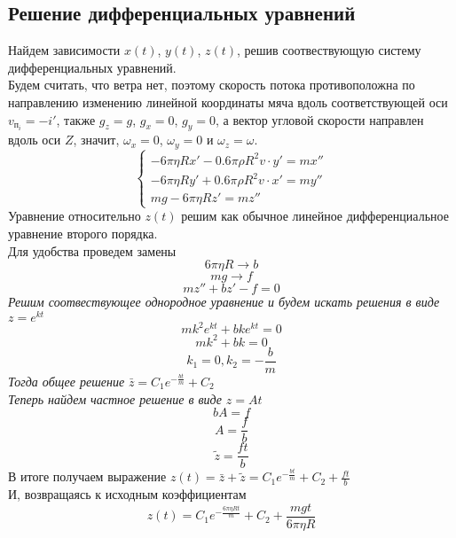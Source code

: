 \documentclass[a5paper, 10pt]{article}
\theoremstyle{definition}
\theoremstyle{plain}
\theoremstyle{remark}
\begin{document}
\subsection{Решение дифференциальных уравнений}
Найдем зависимости $x(t)$, $y(t)$, $z(t)$, решив соотвествующую систему дифференциальных уравнений.\\
Будем считать, что ветра нет, поэтому скорость потока противоположна по направлению изменению линейной координаты мяча вдоль соответствующей оси $v_{\text{п}_{i}} = -i'$, также $g_z = g$, $g_x = 0$, $g_y = 0$, а вектор угловой скорости направлен вдоль оси $Z$, значит,  $\omega _{x} = 0$, $\omega _{y} = 0$ и $\omega _{z} = \omega$.
\begin{equation}
\begin{cases}
 - 6 \pi  \eta R x' - 0.6 \pi \rho  R^{2} v  \cdot  y' = m x''\\
 - 6 \pi  \eta R y' +0.6 \pi \rho  R^{2} v  \cdot   x'  = m y''\\
m g - 6 \pi  \eta R z'  = m z''
\end{cases}
\end{equation}
Уравнение относительно $z(t)$ решим как обычное линейное дифференциальное уравнение второго порядка.\\
Для удобства проведем замены $$6 \pi \eta R \to b$$ $$  mg  \to f$$
\begin{equation*}
m z'' + b z'-f = 0
\end{equation*}
\textit{Решим соотвествующее однородное уравнение и будем искать решения в виде } $z = e^{kt}$
\begin{equation*}
mk^{2}e^{kt} + bke^{kt} = 0
\end{equation*}
\begin{equation*}
mk^{2} + bk = 0
\end{equation*}
\begin{equation*}
k_1 = 0, k_2 = -\frac{b}{m}
\end{equation*}
\textit{Тогда общее решение } $\bar{z} = C_1 e^{-\frac{bt}{m}} + C_2$\\
\textit{Теперь найдем частное решение в виде } $z = At$
\begin{equation*}
bA = f
\end{equation*}
\begin{equation*}
A = \frac{f}{b}
\end{equation*}
\begin{equation}
\tilde{z} = \frac{ft}{b}
\end{equation}
В итоге получаем выражение $z(t) = \bar{z} + \tilde{z} =  C_1 e^{-\frac{bt}{m}} + C_2 + \frac{ft}{b}$ \\
И, возвращаясь к исходным коэффициентам
\begin{equation}
z(t) = C_1 e^{-\frac{6 \pi \eta Rt}{m}} + C_2 + \frac{mgt}{6 \pi \eta R}
\end{equation}
\end{document}

